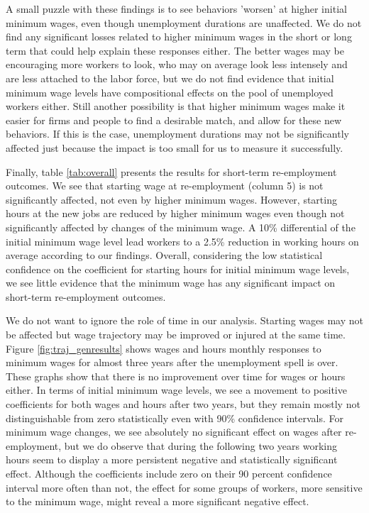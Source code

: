 \documentclass{article}
\begin{document}
A small puzzle with these findings is to see behaviors 'worsen' at higher initial minimum wages, even though unemployment durations are unaffected. We do not find any significant losses related to higher minimum wages in the short or long term that could help explain these responses either. The better wages may be encouraging more workers to look, who may on average look less intensely and are less attached to the labor force, but we do not find evidence that initial minimum wage levels have compositional effects on the pool of unemployed workers either. Still another possibility is that higher minimum wages make it easier for firms and people to find a desirable match, and allow for these new behaviors. If this is the case, unemployment durations may not be significantly affected just because the impact is too small for us to measure it successfully.

Finally, table \ref{tab:overall} presents the results for short-term re-employment outcomes. We see that starting wage at re-employment (column 5) is not significantly affected, not even by higher minimum wages. However, starting hours at the new jobs are reduced by higher minimum wages even though not significantly affected by changes of the minimum wage. A 10\% differential of the initial minimum wage level lead workers to a 2.5\% reduction in working hours on average according to our findings. Overall, considering the low statistical confidence on the coefficient for starting hours for initial minimum wage levels, we see little evidence that the minimum wage has any significant impact on short-term re-employment outcomes.

We do not want to ignore the role of time in our analysis. Starting wages may not be affected but wage trajectory may be improved or injured at the same time. Figure \ref{fig:traj_genresults} shows wages and hours monthly responses to minimum wages for almost three years after the unemployment spell is over. These graphs show that there is no improvement over time for wages or hours either. In terms of initial minimum wage levels, we see a movement to positive coefficients for both wages and hours after two years, but they remain mostly not distinguishable from zero statistically even with 90\% confidence intervals. For minimum wage changes, we see absolutely no significant effect on wages after re-employment, but we do observe that during the following two years working hours seem to display a more persistent negative and statistically significant effect. Although the coefficients include zero on their 90 percent confidence interval more often than not, the effect for some groups of workers, more sensitive to the minimum wage, might reveal a more significant negative effect.
\end{document}
